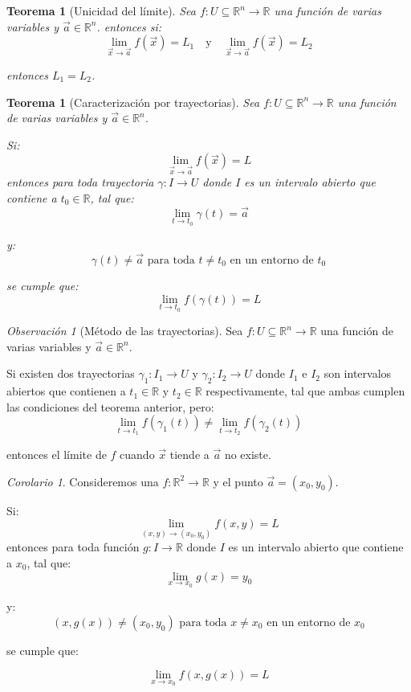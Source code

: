 \documentclass{article}
\newcommand{\R}{\mathbb{R}}
\newcommand{\vect}[1]{\vec{#1}}
\theoremstyle{definition}
\theoremstyle{plain}
\newtheorem{theorem}[definition]{Teorema}
\theoremstyle{remark}
\newtheorem{remark}[definition]{Observación}
\theoremstyle{corollary}
\newtheorem{corollary}[definition]{Corolario}
\begin{document}
\begin{theorem}[Unicidad del límite]
Sea $f : U \subseteq \R^n \to \R$ una función de varias variables y $\vect{a} \in \R^n$. entonces si:
\[
\lim_{\vect{x} \to \vect{a}} f(\vect{x}) = L_1 \quad \text{y} \quad \lim_{\vect{x} \to \vect{a}} f(\vect{x}) = L_2
\]

entonces $L_1 = L_2$.

\end{theorem}

\begin{theorem}[Caracterización por trayectorias]
Sea $f : U \subseteq \R^n \to \R$ una función de varias variables y $\vect{a} \in \R^n$. 

Si:
\[
\lim_{\vect{x} \to \vect{a}} f(\vect{x}) = L
\]
entonces para toda trayectoria $\gamma: I \to U$ donde $I$ es un intervalo abierto que contiene a $t_0 \in \R$, tal que:
\[
\lim_{t \to t_0} \gamma(t) = \vect{a}
\]

y:
\[
\gamma(t) \neq \vect{a} \text{ para toda } t \neq t_0 \text{ en un entorno de } t_0
\]

se cumple que:
\[
\lim_{t \to t_0} f(\gamma(t)) = L
\]
\end{theorem}

\begin{remark}[Método de las trayectorias]
Sea $f : U \subseteq \R^n \to \R$ una función de varias variables y $\vect{a} \in \R^n$.

Si existen dos trayectorias $\gamma_1: I_1 \to U$ y $\gamma_2: I_2 \to U$ donde $I_1$ e $I_2$ son intervalos abiertos que contienen a $t_1 \in \R$ y $t_2 \in \R$ respectivamente, tal que ambas cumplen las condiciones del teorema anterior, pero:
\[
\lim_{t \to t_1} f(\gamma_1(t)) \neq \lim_{t \to t_2} f(\gamma_2(t))
\]

entonces el límite de $f$ cuando $\vect{x}$ tiende a $\vect{a}$ no existe.

\end{remark}

\begin{corollary}
Consideremos una $f: \R^2 \to \R$ y el punto $\vect{a} = (x_0, y_0)$. 

Si:
\[
\lim_{(x, y) \to (x_0, y_0)} f(x, y) = L
\]
entonces para toda función $g: I \to \R$ donde $I$ es un intervalo abierto que contiene a $x_0$, tal que:
\[
\lim_{x \to x_0} g(x) = y_0
\]

y:
\[
(x, g(x)) \neq (x_0, y_0) \text{ para toda } x \neq x_0 \text{ en un entorno de } x_0
\]

se cumple que:

\[
\lim_{x \to x_0} f(x, g(x)) = L
\]
\end{corollary}
\end{document}

